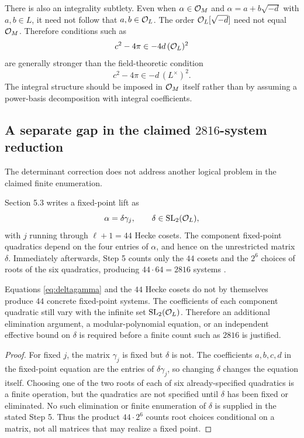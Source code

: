 There is also an integrality subtlety. Even when $\alpha\in\mathcal O_M$ and $\alpha=a+b\sqrt{-d}$ with $a,b\in L$, it need not follow that $a,b\in\mathcal O_L$. The order $\mathcal O_L[\sqrt{-d}]$ need not equal $\mathcal O_M$. Therefore conditions such as
\[
 c^2-4\pi\in -4d\,(\mathcal O_L)^2
\]
are generally stronger than the field-theoretic condition
\[
 c^2-4\pi\in -d\,(L^\times)^2.
\]
The integral structure should be imposed in $\mathcal O_M$ itself rather than by assuming a power-basis decomposition with integral coefficients.


\subsection{A separate gap in the claimed $2816$-system reduction}
The determinant correction does not address another logical problem in the claimed finite enumeration.

Section 5.3 writes a fixed-point lift as
\begin{equation}\label{eq:deltagamma}
 \alpha=\delta\gamma_j,
 \qquad \delta\in\mathrm{SL}_2(\mathcal O_L),
\end{equation}
with $j$ running through $\ell+1=44$ Hecke cosets. The component fixed-point quadratics depend on the four entries of $\alpha$, and hence on the unrestricted matrix $\delta$. Immediately afterwards, Step 5 counts only the $44$ cosets and the $2^6$ choices of roots of the six quadratics, producing $44\cdot64=2816$ systems \cite[Sec.~5.3]{Mostaed2026}.

\begin{proposition}\label{prop:2816}
Equations \eqref{eq:deltagamma} and the $44$ Hecke cosets do not by themselves produce $44$ concrete fixed-point systems. The coefficients of each component quadratic still vary with the infinite set $\mathrm{SL}_2(\mathcal O_L)$. Therefore an additional elimination argument, a modular-polynomial equation, or an independent effective bound on $\delta$ is required before a finite count such as $2816$ is justified.
\end{proposition}
\begin{proof}
For fixed $j$, the matrix $\gamma_j$ is fixed but $\delta$ is not. The coefficients $a,b,c,d$ in the fixed-point equation are the entries of $\delta\gamma_j$, so changing $\delta$ changes the equation itself. Choosing one of the two roots of each of six already-specified quadratics is a finite operation, but the quadratics are not specified until $\delta$ has been fixed or eliminated. No such elimination or finite enumeration of $\delta$ is supplied in the stated Step 5. Thus the product $44\cdot2^6$ counts root choices conditional on a matrix, not all matrices that may realize a fixed point.
\end{proof}


